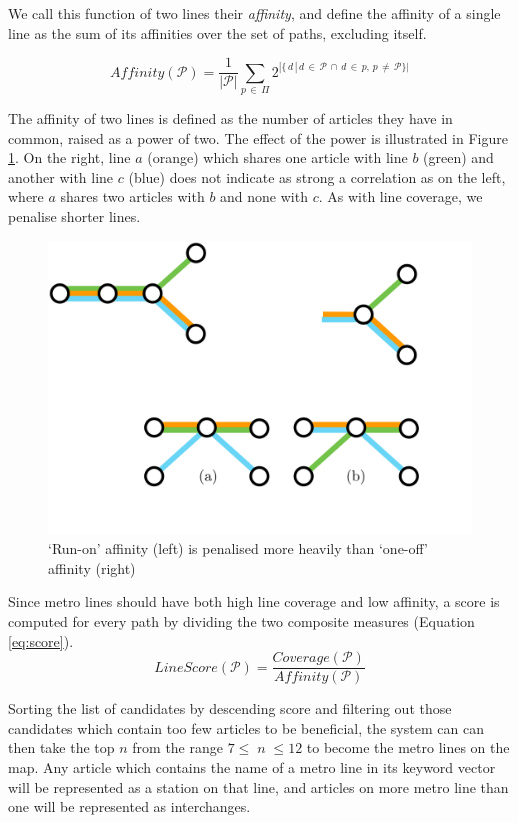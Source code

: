 We call this function of two lines their \textit{affinity}, and define the affinity of a single line as the sum of its affinities over the set of paths, excluding itself.

\begin{equation}
	Affinity(\mathcal{P}) = \frac{1}{|\mathcal{P}|} \sum_{p\,\in{\,\Pi}} 2^{|\{\,d\,|\,d\,\in\,{\mathcal{P}}\,\cap\,d\,\in\,{p},\,p\,\neq\,\mathcal{P}\}|}
\end{equation}

The affinity of two lines is defined as the number of articles they have in common, raised as a power of two. The effect of the power is illustrated in Figure \ref{fig:abcaffinity}. On the right, line $a$ (orange) which shares one article with line $b$ (green) and another with line $c$ (blue) does not indicate as strong a correlation as on the left, where $a$ shares two articles with $b$ and none with $c$. As with line coverage, we penalise shorter lines.

\begin{figure}[htbp!]
	\centering
	\includegraphics[width=.7\textwidth]{img/implementation/abcaffinity.pdf}
	\caption{`Run-on' affinity (left) is penalised more heavily than `one-off' affinity (right)}
	\label{fig:abcaffinity}
\end{figure}

Since metro lines should have both high line coverage and low affinity, a score is computed for every path by dividing the two composite measures (Equation \ref{eq:score}).
\begin{equation}
	LineScore(\mathcal{P}) = \frac{Coverage(\mathcal{P})}{Affinity(\mathcal{P})}
	\label{eq:score}
\end{equation}

Sorting the list of candidates by descending score and filtering out those candidates which contain too few articles to be beneficial, the system can can then take the top $n$ from the range $7 \leq\;n\;\leq 12$ to become the metro lines on the map. Any article which contains the name of a metro line in its keyword vector will be represented as a station on that line, and articles on more metro line than one will be represented as interchanges.

